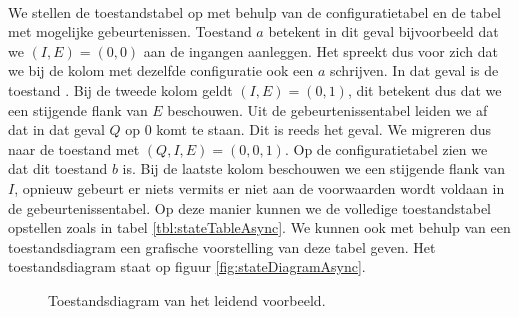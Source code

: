 \paragraph{}
We stellen de toestandstabel op met behulp van de configuratietabel en de tabel met mogelijke gebeurtenissen. Toestand $a$ betekent in dit geval bijvoorbeeld dat we $\left(I,E\right)=\left(0,0\right)$ aan de ingangen aanleggen. Het spreekt dus voor zich dat we bij de kolom met dezelfde configuratie ook een $a$ schrijven. In dat geval is de toestand . Bij de tweede kolom geldt $\left(I,E\right)=\left(0,1\right)$, dit betekent dus dat we een stijgende flank van $E$ beschouwen. Uit de gebeurtenissentabel leiden we af dat in dat geval $Q$ op 0 komt te staan. Dit is reeds het geval. We migreren dus naar de toestand met $\left(Q,I,E\right)=\left(0,0,1\right)$. Op de configuratietabel zien we dat dit toestand $b$ is. Bij de laatste kolom beschouwen we een stijgende flank van $I$, opnieuw gebeurt er niets vermits er niet aan de voorwaarden wordt voldaan in de gebeurtenissentabel. Op deze manier kunnen we de volledige toestandstabel opstellen zoals in tabel \ref{tbl:stateTableAsync}. We kunnen ook met behulp van een toestandsdiagram een grafische voorstelling van deze tabel geven. Het toestandsdiagram staat op figuur \ref{fig:stateDiagramAsync}.
\begin{figure}[hbt]
\centering
{}
\caption{Toestandsdiagram van het leidend voorbeeld.}
\end{figure}
